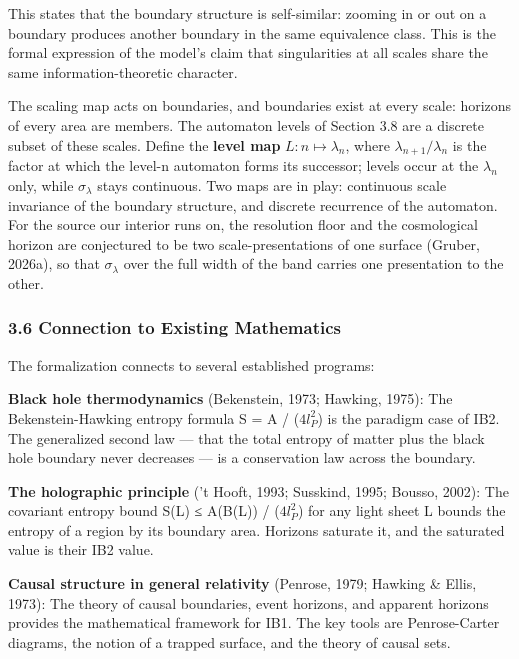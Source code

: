 \documentclass[
]{article}
\begin{document}
This states that the boundary structure is self-similar: zooming in or
out on a boundary produces another boundary in the same equivalence
class. This is the formal expression of the model's claim that
singularities at all scales share the same information-theoretic
character.

The scaling map acts on boundaries, and boundaries exist at every scale:
horizons of every area are members. The automaton levels of Section 3.8
are a discrete subset of these scales. Define the \textbf{level map}
\(L: n \mapsto \lambda_n\), where \(\lambda_{n+1} / \lambda_n\) is the
factor at which the level-n automaton forms its successor; levels occur
at the \(\lambda_n\) only, while \(\sigma_\lambda\) stays continuous.
Two maps are in play: continuous scale invariance of the boundary
structure, and discrete recurrence of the automaton. For the source our
interior runs on, the resolution floor and the cosmological horizon are
conjectured to be two scale-presentations of one surface (Gruber,
2026a), so that \(\sigma_\lambda\) over the full width of the band
carries one presentation to the other.

\hypertarget{connection-to-existing-mathematics}{%
\subsubsection{3.6 Connection to Existing
Mathematics}\label{connection-to-existing-mathematics}}

The formalization connects to several established programs:

\textbf{Black hole thermodynamics} (Bekenstein, 1973; Hawking, 1975):
The Bekenstein-Hawking entropy formula S = A / (\(4 l_P^2\)) is the
paradigm case of IB2. The generalized second law --- that the total
entropy of matter plus the black hole boundary never decreases --- is a
conservation law across the boundary.

\textbf{The holographic principle} ('t Hooft, 1993; Susskind, 1995;
Bousso, 2002): The covariant entropy bound S(L) ≤ A(B(L)) /
(\(4 l_P^2\)) for any light sheet L bounds the entropy of a region by
its boundary area. Horizons saturate it, and the saturated value is
their IB2 value.

\textbf{Causal structure in general relativity} (Penrose, 1979; Hawking
\& Ellis, 1973): The theory of causal boundaries, event horizons, and
apparent horizons provides the mathematical framework for IB1. The key
tools are Penrose-Carter diagrams, the notion of a trapped surface, and
the theory of causal sets.
\end{document}
